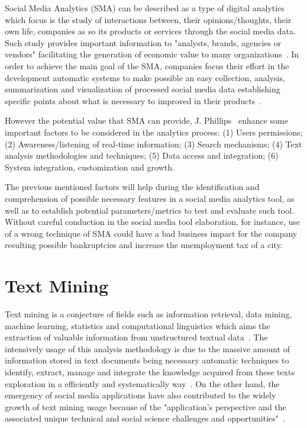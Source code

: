 Social Media Analytics (SMA) can be described as a type of digital analytics which focus is the study of interactions between, their opinions/thoughts, their own life, companies as so its products or services through the social media data. Such study provides important information to "analysts, brands, agencies or vendors" facilitating the generation of economic value to many organizations~\cite{kn:Judah2012}. In order to achieve the main goal of the SMA, companies focus their effort in the development automatic systems to make possible an easy collection, analysis, summarization and visualization of processed social media data establishing specific points about what is necessary to improved in their products~\cite{zeng2010social}.

However the potential value that SMA can provide, J. Phillips~\cite{kn:Judah2012} enhance some important factors to be considered in the analytics process: (1) Users permissions; (2) Awareness/listening of real-time information; (3) Search mechanisms; (4) Text analysis methodologies and techniques; (5) Data access and integration; (6) System integration, customization and growth.

The previous mentioned factors will help during the identification and comprehension of possible necessary features in a social media analytics tool, as well as to establish potential parameters/metrics to test and evaluate such tool. Without careful conduction in the social media tool elaboration, for instance, use of a wrong technique of SMA could have a bad business impact for the company resulting possible bankruptcies and increase the unemployment tax of a city.


\section{Text Mining}

Text mining is a conjecture of fields such as information retrieval, data mining, machine learning, statistics and computational linguistics which aims the extraction of valuable information from unstructured textual data~\cite{kn:He2013}. The intensively usage of this analysis methodology is due to the massive amount of information stored in text documents being necessary automatic techniques to identify, extract, manage and integrate the knowledge acquired from these texts exploration in a efficiently and systematically way~\cite{ananiadou2015textmining}. On the other hand, the emergency of social media applications have also contributed to the widely growth of text mining usage because of the "application’s perspective and the associated unique technical and social science challenges and opportunities"~\cite{zeng2010social}.

